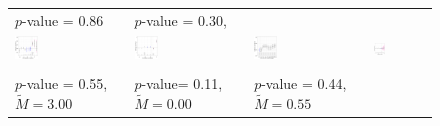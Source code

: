 \documentclass[12pt]{article}
\begin{document}
\begin{figure}[!h]
{\begin{tabular}{C{3.8cm}C{3.8cm}C{3.8cm}C{3.8cm}}
   \citet{Fresh2018} \newline  $p$-value = 0.86 &
      \citet{Garfias2019jop} \newline  $p$-value = 0.30,  \\
  \hspace{-2em}  \includegraphics[width = 0.22\textwidth]{figure/placebo_honest/FouirnaiesHall_honest_placebo.png} &
  \hspace{-2em} \includegraphics[width = 0.22\textwidth]{figure/placebo_honest/Fouirnaies2022_honest_placebo.png}  &
  \hspace{-2em}  \includegraphics[width = 0.22\textwidth]{figure/placebo/Fresh_placebo.png} &
   \hspace{-2em}  \includegraphics[width = 0.22\textwidth]{figure/placebo_honest/garfias_honest_placebo.png}\\ \\
   \citet{Grumbach2020}\newline  $p$-value = 0.55, $\tilde{M} = 3.00$ &
   \citet{Grumbach2022} \newline  $p $-value= 0.11, $\tilde{M} = 0.00$ & 
   \citet{hainmueller2019does} \newline  $p$-value = 0.44, $\tilde{M} = 0.55$  &

\end{tabular}}
\end{figure}
\end{document}
